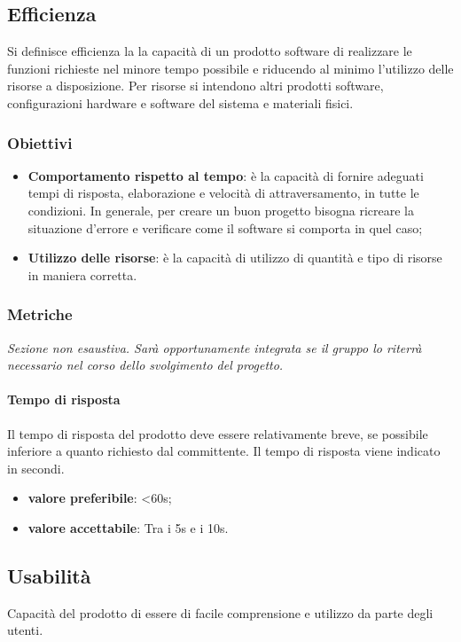 \subsection{Efficienza}
Si definisce efficienza la la capacità di un prodotto software di realizzare le funzioni richieste nel minore tempo possibile e riducendo al minimo l'utilizzo delle risorse a disposizione.
Per risorse si intendono altri prodotti software, configurazioni hardware e software del sistema e materiali fisici.
\subsubsection{Obiettivi}
\begin{itemize}
\item \textbf{Comportamento rispetto al tempo}: è la capacità di fornire adeguati tempi di risposta, elaborazione e velocità di attraversamento, in tutte le condizioni.
In generale, per creare un buon progetto bisogna ricreare la situazione d'errore e verificare come il software si comporta in quel caso;
\item \textbf{Utilizzo delle risorse}: è la capacità di utilizzo di quantità e tipo di risorse in maniera corretta.
\end{itemize}

\subsubsection{Metriche}
\textit{Sezione non esaustiva. Sarà opportunamente integrata se il gruppo lo riterrà necessario nel corso dello svolgimento del progetto.}

\paragraph{Tempo di risposta}
Il tempo di risposta del prodotto deve essere relativamente breve, se possibile inferiore a quanto richiesto dal committente. Il tempo di risposta viene indicato in secondi.
\begin{itemize}
\item \textbf{valore preferibile}: <60s;
\item \textbf{valore accettabile}: Tra i 5s e i 10s.
\end{itemize}

\subsection{Usabilità}
Capacità del prodotto di essere di facile comprensione e utilizzo da parte degli utenti.
